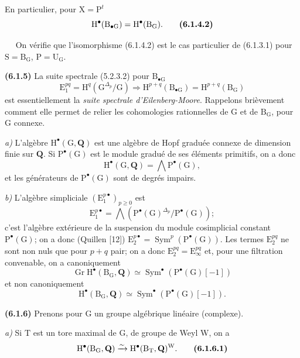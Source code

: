 \documentclass[11pt,leqno]{article}
\newcommand{\Page}[1]{\ifvmode\noindent\else\unskip\ \fi{\footnotesize\textcolor{gray}{[p.\,#1]}}\ \ignorespaces}
\begin{document}
En particulier, pour \(\mathrm{X}=\mathrm{P}^{t}\)
\[
\mathrm{H}^{\bullet}(\mathrm{B}_{\bullet\mathrm{G}})
=\mathrm{H}^{\bullet}(\mathrm{B}_{\mathrm{G}}).
\tag*{\textbf{(6.1.4.2)}}
\]

\Page{18}
On vérifie que l’isomorphisme (6.1.4.2) est le cas particulier de (6.1.3.1) pour \(\mathrm{S}=\mathrm{B}_{\mathrm{G}}\), \(\mathrm{P}=\mathrm{U}_{\mathrm{G}}\).

\textbf{(6.1.5)} La suite spectrale (5.2.3.2) pour \(\mathrm{B}_{\bullet\mathrm{G}}\)
\[
\mathrm{E}_{1}^{pq}=\mathrm{H}^{q}(\mathrm{G}^{\Delta_p}/\mathrm{G})
\Rightarrow
\mathrm{H}^{p+q}(\mathrm{B}_{\bullet\mathrm{G}})
=\mathrm{H}^{p+q}(\mathrm{B}_{\mathrm{G}})
\]
est essentiellement la \textit{suite spectrale d’Eilenberg-Moore}. Rappelons brièvement comment elle permet de relier les cohomologies rationnelles de \(\mathrm{G}\) et de \(\mathrm{B}_{\mathrm{G}}\), pour \(\mathrm{G}\) connexe.

\textit{a)} L’algèbre \(\mathrm{H}^{\bullet}(\mathrm{G},\mathbf{Q})\) est une algèbre de Hopf graduée connexe de dimension finie sur \(\mathbf{Q}\). Si \(\mathrm{P}^{\bullet}(\mathrm{G})\) est le module gradué de ses éléments primitifs, on a donc
\[
\mathrm{H}^{\bullet}(\mathrm{G},\mathbf{Q})
=\mathop{\textstyle\bigwedge}\mathrm{P}^{\bullet}(\mathrm{G}),
\]
et les générateurs de \(\mathrm{P}^{\bullet}(\mathrm{G})\) sont de degrés impairs.

\textit{b)} L’algèbre simpliciale \((\mathrm{E}_{1}^{p\bullet})_{p\geq 0}\) est
\[
\mathrm{E}_{1}^{p\bullet}
=\mathop{\textstyle\bigwedge}
(\mathrm{P}^{\bullet}(\mathrm{G})^{\Delta_p}/\mathrm{P}^{\bullet}(\mathrm{G}));
\]
c’est l’algèbre extérieure de la suspension du module cosimplicial constant \(\mathrm{P}^{\bullet}(\mathrm{G})\); on a donc (Quillen [12]) \(\mathrm{E}_{2}^{p\bullet}=\operatorname{Sym}^{p}(\mathrm{P}^{\bullet}(\mathrm{G}))\). Les termes \(\mathrm{E}_{2}^{pq}\) ne sont non nuls que pour \(p+q\) pair; on a donc \(\mathrm{E}_{2}^{pq}=\mathrm{E}_{\infty}^{pq}\) et, pour une filtration convenable, on a canoniquement
\[
\operatorname{Gr}\mathrm{H}^{\bullet}(\mathrm{B}_{\mathrm{G}},\mathbf{Q})
\simeq\operatorname{Sym}^{\bullet}(\mathrm{P}^{\bullet}(\mathrm{G})[-1])
\]
et non canoniquement
\[
\mathrm{H}^{\bullet}(\mathrm{B}_{\mathrm{G}},\mathbf{Q})
\simeq\operatorname{Sym}^{\bullet}(\mathrm{P}^{\bullet}(\mathrm{G})[-1]).
\]

\textbf{(6.1.6)} Prenons pour \(\mathrm{G}\) un groupe algébrique linéaire (complexe).

\textit{a)} Si \(\mathrm{T}\) est un tore maximal de \(\mathrm{G}\), de groupe de Weyl \(\mathrm{W}\), on a
\[
\mathrm{H}^{\bullet}(\mathrm{B}_{\mathrm{G}},\mathbf{Q})
\xrightarrow{\sim}
\mathrm{H}^{\bullet}(\mathrm{B}_{\mathrm{T}},\mathbf{Q})^{\mathrm{W}}.
\tag*{\textbf{(6.1.6.1)}}
\]
\end{document}
